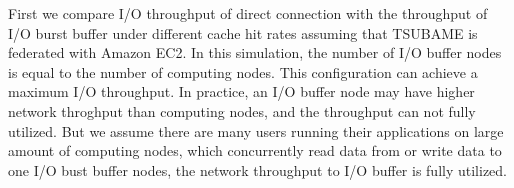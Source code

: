 

First we compare I/O throughput of direct connection with the throughput of  I/O burst buffer under different cache hit rates assuming that TSUBAME is federated with Amazon EC2.
In this simulation, the number of I/O buffer nodes is equal to the number of computing nodes. This configuration can achieve a maximum I/O throughput.
In practice, an I/O buffer node may have higher network throghput than computing nodes, and the throughput can not fully utilized.
But we assume there are many users running their applications on large amount of computing nodes, which concurrently read data from or write data to one I/O bust buffer nodes, the network throughput to I/O buffer is fully utilized.


